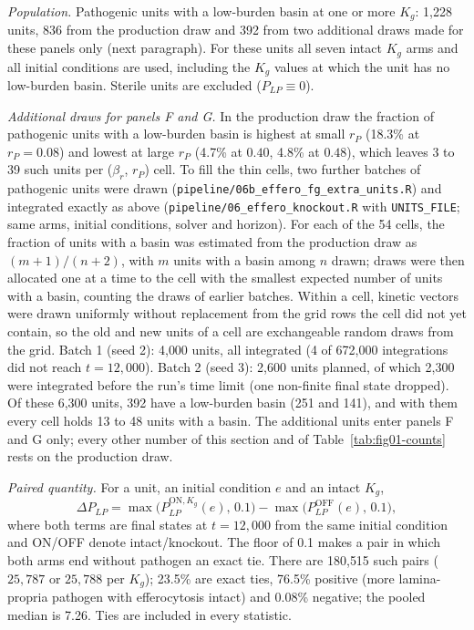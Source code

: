 \documentclass[11pt]{article}
\newcommand{\bros}{\beta_r}
\begin{document}
\emph{Population.} Pathogenic units with a low-burden basin at one or more $K_g$:
1{,}228 units, 836 from the production draw and 392 from two additional draws made
for these panels only (next paragraph). For these units all seven intact $K_g$ arms
and all initial conditions are used, including the $K_g$ values at which the unit has
no low-burden basin. Sterile units are excluded ($P_{LP} \equiv 0$).

\emph{Additional draws for panels F and G.} In the production draw the fraction of
pathogenic units with a low-burden basin is highest at small $r_P$ (18.3\% at
$r_P = 0.08$) and lowest at large $r_P$ (4.7\% at $0.40$, 4.8\% at $0.48$), which leaves 3
to 39 such units per ($\bros$, $r_P$) cell. To fill
the thin cells, two further batches of pathogenic units were drawn
(\texttt{pipeline/06b\_effero\_fg\_extra\_units.R}) and integrated exactly as above
(\texttt{pipeline/06\_effero\_knockout.R} with \texttt{UNITS\_FILE}; same arms, initial
conditions, solver and horizon). For each of the 54 cells, the fraction of units with
a basin was estimated from the production draw as $(m+1)/(n+2)$, with $m$ units with a
basin among $n$ drawn; draws were then allocated one at a time to the cell with the
smallest expected number of units with a basin, counting the draws of earlier batches.
Within a cell, kinetic vectors were drawn uniformly without replacement from the grid
rows the cell did not yet contain, so the old and new units of a cell are exchangeable
random draws from the grid. Batch 1 (seed 2): 4{,}000 units, all integrated (4 of
672{,}000 integrations did not reach $t = 12{,}000$). Batch 2 (seed 3): 2{,}600 units
planned, of which 2{,}300 were integrated before the run's time limit (one non-finite
final state dropped). Of these 6{,}300 units, 392 have a low-burden basin (251 and
141), and with them every cell holds 13 to 48 units with a basin. The additional units
enter panels F and G only; every other number of this section and of
Table~\ref{tab:fig01-counts} rests on the production draw.

\emph{Paired quantity.} For a unit, an initial condition $e$ and an intact $K_g$,
\begin{equation}
  \Delta P_{LP} = \max\!\big(P_{LP}^{\mathrm{ON}, K_g}(e),\, 0.1\big)
                - \max\!\big(P_{LP}^{\mathrm{OFF}}(e),\, 0.1\big),
  \label{eq:fig01-dplp}
\end{equation}
where both terms are final states at $t = 12{,}000$ from the same initial condition
and ON/OFF denote intact/knockout. The floor of 0.1 makes a pair in which both arms
end without pathogen an exact tie. There are 180{,}515 such pairs ($25{,}787$ or
$25{,}788$ per $K_g$); 23.5\% are exact ties, 76.5\% positive (more lamina-propria
pathogen with efferocytosis intact) and 0.08\% negative; the pooled median is 7.26.
Ties are included in every statistic.
\end{document}
